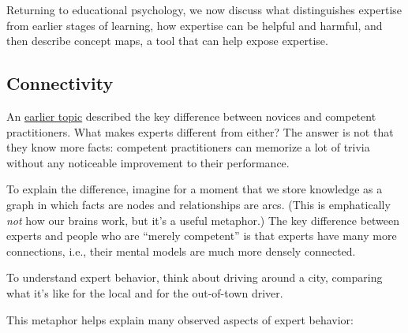 
Returning to educational psychology, we now discuss what distinguishes
expertise from earlier stages of learning, how expertise can be helpful
and harmful, and then describe concept maps, a tool that can help expose
expertise.

\subsection{Connectivity}\label{connectivity}

An \href{\{\{\%20page.root\%20\}\}/03-novice/}{earlier topic} described
the key difference between novices and competent practitioners. What
makes experts different from either? The answer is not that they know
more facts: competent practitioners can memorize a lot of trivia without
any noticeable improvement to their performance.

To explain the difference, imagine for a moment that we store knowledge
as a graph in which facts are nodes and relationships are arcs. (This is
emphatically \emph{not} how our brains work, but it's a useful
metaphor.) The key difference between experts and people who are
``merely competent'' is that experts have many more connections, i.e.,
their mental models are much more densely connected.

To understand expert behavior, think about driving around a city,
comparing what it's like for the local and for the out-of-town driver.

This metaphor helps explain many observed aspects of expert behavior:

